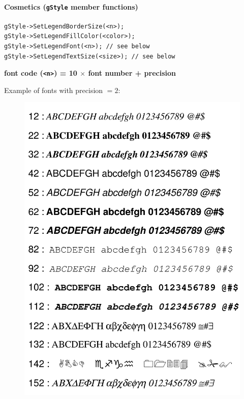 \documentclass[10pt, twoside]{article}
\newcommand{\ttt}[1]{\colorbox{boxgray}{\texttt{#1}}}
\begin{document}
\paragraph{Cosmetics (\ttt{gStyle} member functions)}
\begin{verbatim}
gStyle->SetLegendBorderSize(<n>);
gStyle->SetLegendFillColor(<color>);
gStyle->SetLegendFont(<n>); // see below
gStyle->SetLegendTextSize(<size>); // see below
\end{verbatim}
\begin{center}
\textbf{font code (\ttt{<n>}) = 10 $\times$ font number + precision}
\end{center}
Example of fonts with precision $= 2$:
\begin{figure}[H]
\centering
\includegraphics[scale=0.13]{imgs_root/fonts.png}
\end{figure}
\end{document}
